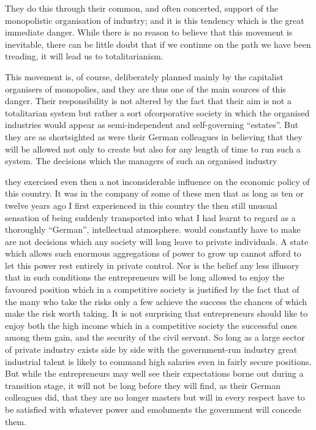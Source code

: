 \documentclass[11pt,openany]{book}
\begin{document}
They do this through their common, and often concerted, support of the monopolistic organisation of industry; and it is this tendency which is the great immediate danger. While there is no reason to believe that this movement is inevitable, there can be little doubt that if we continue on the path we have been treading, it will lead us to totalitarianism.

This movement is, of course, deliberately planned mainly by the capitalist organisers of monopolies, and they are thus one of the main sources of this danger. Their responsibility is not altered by the fact that their aim is not a totalitarian system but rather a sort ofcorporative society in which the organised industries would appear as semi-independent and self-governing ``estates''. But they are as shortsighted as were their German colleagues in believing that they will be allowed not only to create but also for any length of time to run such a system. The decisions which the managers of such an organised industry

they exercised even then a not inconsiderable influence on the economic policy of this country. It was in the company of some of these men that as long as ten or twelve years ago I first experienced in this country the then still unusual sensation of being suddenly transported into what I had learnt to regard as a thoroughly ``German'', intellectual atmosphere. would constantly have to make are not decisions which any society will long leave to private individuals. A state which allows such enormous aggregations of power to grow up cannot afford to let this power rest entirely in private control. Nor is the belief any less illusory that in such conditions the entrepreneurs will be long allowed to enjoy the favoured position which in a competitive society is justified by the fact that of the many who take the risks only a few achieve the success the chances of which make the risk worth taking. It is not surprising that entrepreneurs should like to enjoy both the high income which in a competitive society the successful ones among them gain, and the security of the civil servant. So long as a large sector of private industry exists side by side with the government-run industry great industrial talent is likely to command high salaries even in fairly secure positions. But while the entrepreneurs may well see their expectations borne out during a transition stage, it will not be long before they will find, as their German colleagues did, that they are no longer masters but will in every respect have to be satisfied with whatever power and emoluments the government will concede them.
\end{document}
